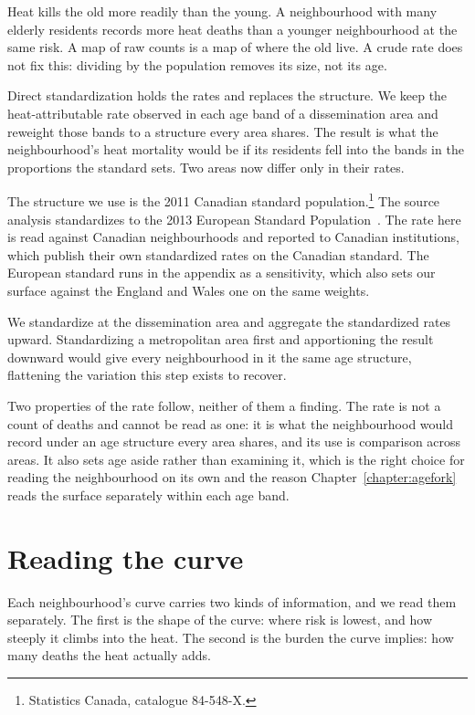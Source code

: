 Heat kills the old more readily than the young. A neighbourhood with many
elderly residents records more heat deaths than a younger neighbourhood at
the same risk. A map of raw counts is a map of where the old live. A crude
rate does not fix this: dividing by the population removes its size, not its
age.

Direct standardization holds the rates and replaces the structure. We keep
the heat-attributable rate observed in each age band of a dissemination area
and reweight those bands to a structure every area shares. The result is
what the neighbourhood's heat mortality would be if its residents fell into
the bands in the proportions the standard sets. Two areas now differ only in
their rates.

The structure we use is the 2011 Canadian standard
population.\footnote{Statistics Canada, catalogue 84-548-X.} The source
analysis standardizes to the 2013 European Standard
Population~\citep{gasparrini2022smallarea}. The rate here is read against
Canadian neighbourhoods and reported to Canadian institutions, which publish
their own standardized rates on the Canadian standard. The European standard
runs in the appendix as a sensitivity, which also sets our surface against
the England and Wales one on the same weights.

We standardize at the dissemination area and aggregate the standardized
rates upward. Standardizing a metropolitan area first and apportioning the
result downward would give every neighbourhood in it the same age structure,
flattening the variation this step exists to recover.

Two properties of the rate follow, neither of them a finding. The rate is not
a count of deaths and cannot be read as one: it is what the neighbourhood
would record under an age structure every area shares, and its use is
comparison across areas. It also sets age aside rather than examining it,
which is the right choice for reading the neighbourhood on its own and the
reason Chapter~\ref{chapter:agefork} reads the surface separately within each
age band.

\section{Reading the curve}\label{sec:readingthecurve}

Each neighbourhood's curve carries two kinds of information, and we read them separately. The first is the shape of the curve: where risk is lowest, and how steeply it climbs into the heat. The second is the burden the curve implies: how many deaths the heat actually adds.


